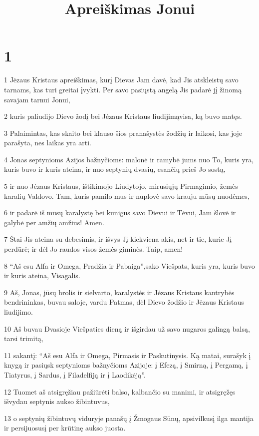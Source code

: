 

\title{Apreiškimas Jonui}

\chapter{1}


\par 1 Jėzaus Kristaus apreiškimas, kurį Dievas Jam davė, kad Jis atskleistų savo tarnams, kas turi greitai įvykti. Per savo pasiųstą angelą Jis padarė jį žinomą savajam tarnui Jonui, 
\par 2 kuris paliudijo Dievo žodį bei Jėzaus Kristaus liudijimą­visa, ką buvo matęs. 
\par 3 Palaimintas, kas skaito bei klauso šios pranašystės žodžių ir laikosi, kas joje parašyta, nes laikas yra arti. 
\par 4 Jonas septynioms Azijos bažnyčioms: malonė ir ramybė jums nuo To, kuris yra, kuris buvo ir kuris ateina, ir nuo septynių dvasių, esančių prieš Jo sostą, 
\par 5 ir nuo Jėzaus Kristaus, ištikimojo Liudytojo, mirusiųjų Pirmagimio, žemės karalių Valdovo. Tam, kuris pamilo mus ir nuplovė savo krauju mūsų nuodėmes, 
\par 6 ir padarė iš mūsų karalystę bei kunigus savo Dievui ir Tėvui,­ Jam šlovė ir galybė per amžių amžius! Amen. 
\par 7 Štai Jis ateina su debesimis, ir išvys Jį kiekviena akis, net ir tie, kurie Jį perdūrė; ir dėl Jo raudos visos žemės giminės. Taip, amen! 
\par 8 “Aš esu Alfa ir Omega, Pradžia ir Pabaiga”,­sako Viešpats, kuris yra, kuris buvo ir kuris ateina, Visagalis. 
\par 9 Aš, Jonas, jūsų brolis ir sielvarto, karalystės ir Jėzaus Kristaus kantrybės bendrininkas, buvau saloje, vardu Patmas, dėl Dievo žodžio ir Jėzaus Kristaus liudijimo. 
\par 10 Aš buvau Dvasioje Viešpaties dieną ir išgirdau už savo nugaros galingą balsą, tarsi trimitą, 
\par 11 sakantį: “Aš esu Alfa ir Omega, Pirmasis ir Paskutinysis. Ką matai, surašyk į knygą ir pasiųsk septynioms bažnyčioms Azijoje: į Efezą, į Smirną, į Pergamą, į Tiatyrus, į Sardus, į Filadelfiją ir į Laodikėją”. 
\par 12 Tuomet aš atsigręžiau pažiūrėti balso, kalbančio su manimi, ir atsigręžęs išvydau septynis aukso žibintuvus, 
\par 13 o septynių žibintuvų viduryje­ panašų į Žmogaus Sūnų, apsivilkusį ilga mantija ir persijuosusį per krūtinę aukso juosta. 
